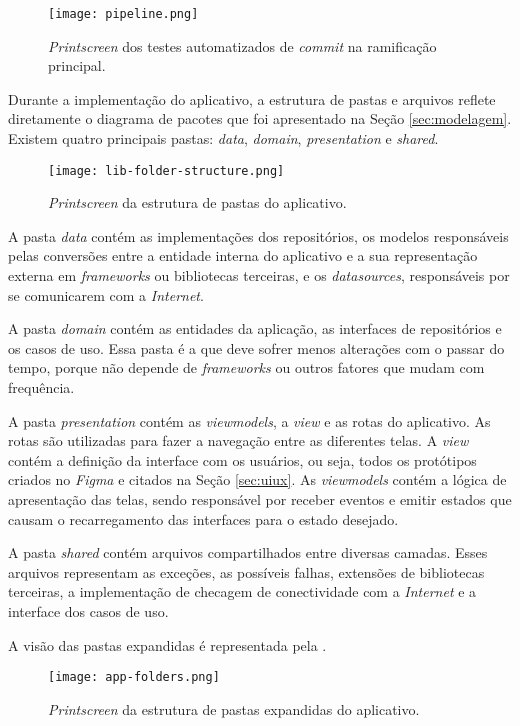 \begin{figure}[!htb]
  \centering
  \texttt{[image: pipeline.png]}
  \caption{\textit{Printscreen} dos testes automatizados de \textit{commit} na ramificação principal.}
  \label{fig:pipelineci}
\end{figure}

Durante a implementação do aplicativo, a estrutura de pastas e arquivos reflete diretamente o diagrama de pacotes que foi apresentado na Seção \ref{sec:modelagem}. Existem quatro principais pastas: \textit{data}, \textit{domain}, \textit{presentation} e \textit{shared}.

\begin{figure}[!htb]
  \centering
  \texttt{[image: lib-folder-structure.png]}
  \caption{\textit{Printscreen} da estrutura de pastas do aplicativo.}
\end{figure}

A pasta \textit{data} contém as implementações dos repositórios, os modelos responsáveis pelas conversões entre a entidade interna do aplicativo e a sua representação externa em \textit{frameworks} ou bibliotecas terceiras, e os \textit{datasources}, responsáveis por se comunicarem com a \textit{Internet}.

A pasta \textit{domain} contém as entidades da aplicação, as interfaces de repositórios e os casos de uso. Essa pasta é a que deve sofrer menos alterações com o passar do tempo, porque não depende de \textit{frameworks} ou outros fatores que mudam com frequência.

A pasta \textit{presentation} contém as \textit{viewmodels}, a \textit{view} e as rotas do aplicativo. As rotas são utilizadas para fazer a navegação entre as diferentes telas. A \textit{view} contém a definição da interface com os usuários, ou seja, todos os protótipos criados no \textit{Figma} e citados na Seção \ref{sec:uiux}. As \textit{viewmodels} contém a lógica de apresentação das telas, sendo responsável por receber eventos e emitir estados que causam o recarregamento das interfaces para o estado desejado.

A pasta \textit{shared} contém arquivos compartilhados entre diversas camadas. Esses arquivos representam as exceções, as possíveis falhas, extensões de bibliotecas terceiras, a implementação de checagem de conectividade com a \textit{Internet} e a interface dos casos de uso.

A visão das pastas expandidas é representada pela .

\begin{figure}[!htb]
  \centering
  \texttt{[image: app-folders.png]}
  \caption{\textit{Printscreen} da estrutura de pastas expandidas do aplicativo.}
  \label{fig:folders}
\end{figure}

